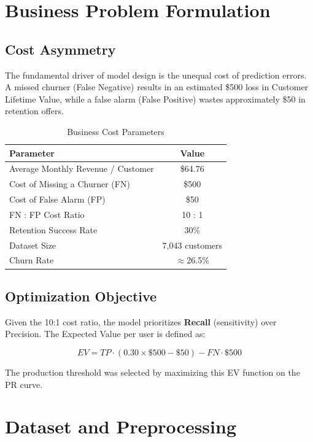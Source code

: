\documentclass[conference]{IEEEtran}
\begin{document}
\section{Business Problem Formulation}

\subsection{Cost Asymmetry}

The fundamental driver of model design is the unequal cost of prediction errors. A missed churner (False Negative) results in an estimated \$500 loss in Customer Lifetime Value, while a false alarm (False Positive) wastes approximately \$50 in retention offers.

\begin{table}[h]
\centering
\caption{Business Cost Parameters}
\begin{tabular}{lc}
\toprule
\textbf{Parameter} & \textbf{Value} \\
\midrule
Average Monthly Revenue / Customer & \$64.76 \\
Cost of Missing a Churner (FN) & \$500 \\
Cost of False Alarm (FP) & \$50 \\
FN : FP Cost Ratio & 10 : 1 \\
Retention Success Rate & 30\% \\
Dataset Size & 7,043 customers \\
Churn Rate & $\approx$26.5\% \\
\bottomrule
\end{tabular}
\end{table}

\subsection{Optimization Objective}

Given the 10:1 cost ratio, the model prioritizes \textbf{Recall} (sensitivity) over Precision. The Expected Value per user is defined as:

\begin{equation}
EV = TP \cdot (0.30 \times \$500 - \$50) - FN \cdot \$500
\end{equation}

The production threshold was selected by maximizing this EV function on the PR curve.

\section{Dataset and Preprocessing}
\end{document}
